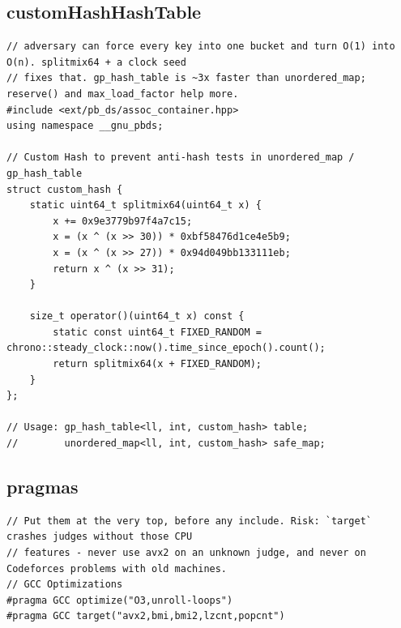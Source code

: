 \documentclass[9pt,a4paper,twocolumn]{extarticle}
\begin{document}
\filbreak
\subsection{customHashHashTable}
\nopagebreak
\begin{lstlisting}
// adversary can force every key into one bucket and turn O(1) into O(n). splitmix64 + a clock seed
// fixes that. gp_hash_table is ~3x faster than unordered_map; reserve() and max_load_factor help more.
#include <ext/pb_ds/assoc_container.hpp>
using namespace __gnu_pbds;

// Custom Hash to prevent anti-hash tests in unordered_map / gp_hash_table
struct custom_hash {
    static uint64_t splitmix64(uint64_t x) {
        x += 0x9e3779b97f4a7c15;
        x = (x ^ (x >> 30)) * 0xbf58476d1ce4e5b9;
        x = (x ^ (x >> 27)) * 0x94d049bb133111eb;
        return x ^ (x >> 31);
    }

    size_t operator()(uint64_t x) const {
        static const uint64_t FIXED_RANDOM = chrono::steady_clock::now().time_since_epoch().count();
        return splitmix64(x + FIXED_RANDOM);
    }
};

// Usage: gp_hash_table<ll, int, custom_hash> table;
//        unordered_map<ll, int, custom_hash> safe_map;
\end{lstlisting}

\filbreak
\subsection{pragmas}
\nopagebreak
\begin{lstlisting}
// Put them at the very top, before any include. Risk: `target` crashes judges without those CPU
// features - never use avx2 on an unknown judge, and never on Codeforces problems with old machines.
// GCC Optimizations
#pragma GCC optimize("O3,unroll-loops")
#pragma GCC target("avx2,bmi,bmi2,lzcnt,popcnt")
\end{lstlisting}

\filbreak
\end{document}
